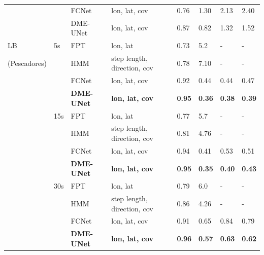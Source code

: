 \documentclass{article}
\begin{document}
\begin{table}[h]
\begin{tabular}{llllllll}
             &     & FCNet  & lon, lat, cov          & 0.76 & 1.30 & 2.13 & 2.40 \\
             &     & DME-UNet   & lon, lat, cov  & 0.87 & 0.82 & 1.32 & 1.52 \\
    \midrule
    LB       & 5s  & FPT    & lon, lat               & 0.73 & 5.2 & - & -        \\
(Pescadores) &     & HMM    & step length, direction, cov & 0.78 & 7.10 & - & -      \\
             &     & FCNet  & lon, lat, cov          & 0.92 & 0.44 & 0.44 & 0.47  \\
             &     & \textbf{DME-UNet}   & \textbf{lon, lat, cov}  & \textbf{0.95} & \textbf{0.36} & \textbf{0.38} & \textbf{0.39}  \\
             & 15s & FPT    & lon, lat               & 0.77 & 5.7 & - & -      \\
             &     & HMM    & step length, direction, cov & 0.81 & 4.76 & - & -  \\
             &     & FCNet  & lon, lat, cov          & 0.94 & 0.41 & 0.53 & 0.51  \\
             &     & \textbf{DME-UNet}   & \textbf{lon, lat, cov}  & \textbf{0.95} & \textbf{0.35} & \textbf{0.40} & \textbf{0.43}  \\
             & 30s & FPT    & lon, lat               & 0.79 & 6.0 & - & -      \\
             &     & HMM    & step length, direction, cov & 0.86 & 4.26 & - & - \\
             &     & FCNet  & lon, lat, cov          & 0.91 & 0.65 & 0.84 & 0.79  \\
             &     & \textbf{DME-UNet}   & \textbf{lon, lat, cov}  & \textbf{0.96} & \textbf{0.57} & \textbf{0.63} & \textbf{0.62}  \\
    \bottomrule
  \end{tabular}
  \label{table2}
\end{table}
\end{document}
